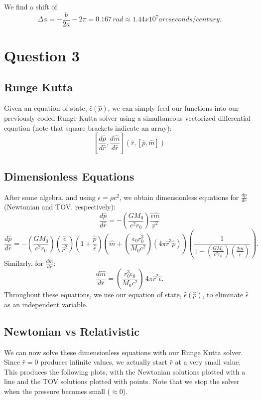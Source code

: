 \documentclass{article}
\begin{document}
We find a shift of
$$\Delta\phi = -\frac{b}{2a} - 2\pi = 0.167 \,rad \approx 1.44 x 10^7 arcseconds/ century.$$




\section{Question 3}
\subsection{Runge Kutta}
Given an equation of state, $\hat{\epsilon}(\hat{p})$, we can simply feed our functions into our previously coded Runge Kutta solver using a simultaneous vectorized differential equation (note that square brackets indicate an array):
$$[\frac{d\hat{p}}{d\hat{r}},\frac{d\hat{m}}{d\hat{r}}](\hat{r},[\hat{p},\hat{m}])$$
\subsection{Dimensionless Equations}
After some algebra, and using $\epsilon =  \rho c^2$, we obtain dimensionless equations for $\frac{dp}{dr}$ (Newtonian and TOV, respectively):
$$\frac{d\hat{p}}{d\hat{r}} = -(\frac{GM_0}{c^2r_0})\frac{\hat{\epsilon}\hat{m}}{\hat{r}^2}$$
$$\frac{d\hat{p}}{d\hat{r}} = -(\frac{GM_0}{c^2r_0})(\frac{\hat{\epsilon}}{\hat{r}^2})(1+\frac{\hat{p}}{\hat{\epsilon}})(\hat{m}+(\frac{\epsilon_0r_0^3}{M_0c^2})(4\pi\hat{r}^3\hat{p}))(\frac{1}{1-(\frac{GM_0}{c^2r_0})(\frac{2\hat{m}}{\hat{r}})}).$$
Similarly, for $\frac{dm}{dr}$:
$$\frac{d\hat{m}}{d\hat{r}} = (\frac{r_0^3\epsilon_0}{M_0c^2})\,4\pi\hat{r}^2\hat{\epsilon}.$$
Throughout these equations, we use our equation of state, $\hat{\epsilon}(\hat{p})$, to eliminate $\hat{\epsilon}$ as an independent variable.

\subsection{Newtonian vs Relativistic}
We can now solve these dimensionless equations with our Runge Kutta solver. Since $\hat{r} = 0$ produces infinite values, we actually start $\hat{r}$ at a very small value. This produces the following plots, with the Newtonian solutions plotted with a line and the TOV solutions plotted with points. Note that we stop the solver when the pressure becomes small ($\approx 0$).
\end{document}
